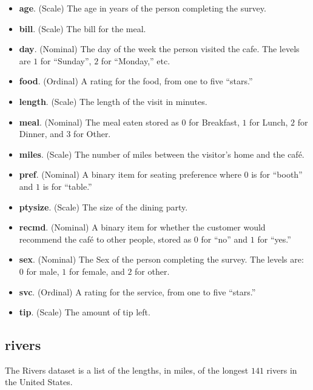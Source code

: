 \begin{itemize}
  \item \textbf{age}. (Scale) The age in years of the person completing the survey.
  \item \textbf{bill}. (Scale) The bill for the meal.
  \item \textbf{day}. (Nominal) The day of the week the person visited the cafe. The levels are $ 1 $ for ``Sunday'', $ 2 $ for ``Monday,'' etc.
  \item \textbf{food}. (Ordinal) A rating for the food, from one to five ``stars.''
  \item \textbf{length}. (Scale) The length of the visit in minutes.
  \item \textbf{meal}. (Nominal) The meal eaten stored as $ 0 $ for Breakfast, $ 1 $ for Lunch, $ 2 $ for Dinner, and $ 3 $ for Other.
  \item \textbf{miles}. (Scale) The number of miles between the visitor's home and the caf\'{e}.
  \item \textbf{pref}. (Nominal) A binary item for seating preference where $ 0 $ is for ``booth'' and $ 1 $ is for ``table.''
  \item \textbf{ptysize}. (Scale) The size of the dining party.
  \item \textbf{recmd}. (Nominal) A binary item for whether the customer would recommend the caf\'{e} to other people, stored as $ 0 $ for ``no'' and $ 1 $ for ``yes.''   
  \item \textbf{sex}. (Nominal) The Sex of the person completing the survey. The levels are: $ 0 $ for male, $ 1 $ for female, and $ 2 $ for other. 
  \item \textbf{svc}.  (Ordinal) A rating for the service, from one to five ``stars.''
  \item \textbf{tip}. (Scale) The amount of tip left.
\end{itemize}

\subsection{rivers}

The Rivers dataset is a list of the lengths, in miles, of the longest $ 141 $ rivers in the United States.

